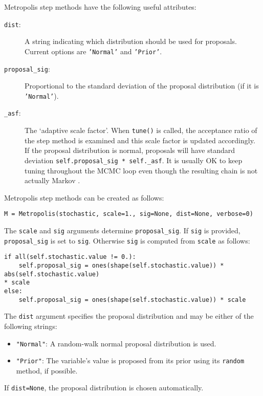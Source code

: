 Metropolis step methods have the following useful attributes:
\begin{description}
    \item[\texttt{dist}:] A string indicating which distribution should be used for proposals. Current options are \texttt{'Normal'} and \texttt{'Prior'}.
    \item[\texttt{proposal\_sig}:] Proportional to the standard deviation of the proposal distribution (if it is \texttt{'Normal'}).
    \item[\texttt{\_asf}:] The `adaptive scale factor'. When \texttt{tune()} is called, the acceptance ratio of the step method is examined and this scale factor is updated accordingly. If the proposal distribution is normal, proposals will have standard deviation \texttt{self.proposal\_sig * self.\_asf}. It is usually OK to keep tuning throughout the MCMC loop even though the resulting chain is not actually Markov \cite{tuning,Haario:2001lr}. %
\end{description}

Metropolis step methods can be created as follows:
\begin{verbatim}
M = Metropolis(stochastic, scale=1., sig=None, dist=None, verbose=0)
\end{verbatim}
The \texttt{scale} and \texttt{sig} arguments determine \texttt{proposal\_sig}. If \texttt{sig} is provided, \texttt{proposal\_sig} is set to \texttt{sig}. Otherwise \texttt{sig} is computed from \texttt{scale} as follows:
\begin{verbatim}
if all(self.stochastic.value != 0.):
    self.proposal_sig = ones(shape(self.stochastic.value)) * abs(self.stochastic.value) 
* scale
else:
    self.proposal_sig = ones(shape(self.stochastic.value)) * scale
\end{verbatim}

The \texttt{dist} argument specifies the proposal distribution and may be either of the following strings:
\begin{itemize}
    \item \texttt{"Normal"}: A random-walk normal proposal distribution is used.
    \item \texttt{"Prior"}: The variable's value is proposed from its prior using its \texttt{random} method, if possible.
\end{itemize}
If \texttt{dist=None}, the proposal distribution is chosen automatically.

